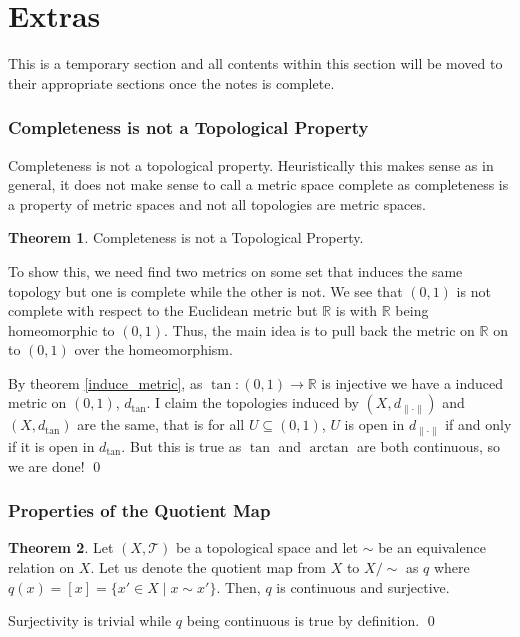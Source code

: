 \documentclass[
]{article}
\theoremstyle{definition}
\newtheorem{theorem}{Theorem}
\theoremstyle{definition}
\begin{document}
\hypertarget{extras}{%
\section{Extras}\label{extras}}

This is a temporary section and all contents within this section will be
moved to their appropriate sections once the notes is complete.

\hypertarget{completeness-is-not-a-topological-property}{%
\subsubsection{Completeness is not a Topological
Property}\label{completeness-is-not-a-topological-property}}

Completeness is not a topological property. Heuristically this makes
sense as in general, it does not make sense to call a metric space
complete as completeness is a property of metric spaces and not all
topologies are metric spaces.

\begin{theorem}
  Completeness is not a Topological Property.
\end{theorem}
\proof

To show this, we need find two metrics on some set that induces the same
topology but one is complete while the other is not. We see that
\((0, 1)\) is not complete with respect to the Euclidean metric but
\(\mathbb{R}\) is with \(\mathbb{R}\) being homeomorphic to \((0, 1)\).
Thus, the main idea is to pull back the metric on \(\mathbb{R}\) on to
\((0, 1)\) over the homeomorphism.

By theorem \ref{induce_metric}, as \(\tan : (0, 1) \to \mathbb{R}\) is
injective we have a induced metric on \((0, 1)\), \(d_{\tan}\). I claim
the topologies induced by \((X, d_{\| \cdot \|})\) and \((X, d_{\tan})\)
are the same, that is for all \(U \subseteq (0, 1)\), \(U\) is open in
\(d_{\| \cdot \|}\) if and only if it is open in \(d_{\tan}\). But this
is true as \(\tan\) and \(\arctan\) are both continuous, so we are done!
\qed

\hypertarget{properties-of-the-quotient-map}{%
\subsubsection{Properties of the Quotient
Map}\label{properties-of-the-quotient-map}}

\begin{theorem}
  Let \((X, \mathcal{T})\) be a topological space and let \(\sim\) be an equivalence 
  relation on \(X\). Let us denote the quotient map from \(X\) to \(X / \sim\) as 
  \(q\) where \(q(x) = [x] = \{x' \in X \mid x \sim x'\}\). Then, \(q\) is continuous
  and surjective.
\end{theorem}
\proof

Surjectivity is trivial while \(q\) being continuous is true by
definition. \qed
\end{document}
